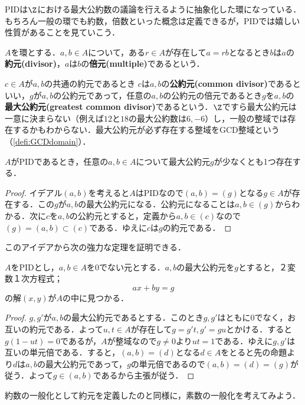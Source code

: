 PIDは$\Z$における最大公約数の議論を行えるように抽象化した環になっている．もちろん一般の環でも約数，倍数といった概念は定義できるが，PIDでは嬉しい性質があることを見ていこう．

\begin{defi}[約元，倍元]
	$A$を環とする．$a,b\in A$について，ある$r\in A$が存在して$a=rb$となるとき$b$は$a$の\textbf{約元(divisor)}，$a$は$b$の\textbf{倍元(multiple)}であるという．
\end{defi}

$c\in A$が$a,b$の共通の約元であるとき $c$は$a,b$の\textbf{公約元(common divisor)}であるといい，$g$が$a,b$の公約元であって，任意の$a,b$の公約元の倍元であるとき$g$を$a,b$の\textbf{最大公約元(greatest common divisor)}であるという．$\Z$ですら最大公約元は一意に決まらない（例えば$12$と$18$の最大公約数は$6,-6$）し，一般の整域では存在するかもわからない．最大公約元が必ず存在する整域をGCD整域という（\ref{defi:GCDdomain}）．

\begin{prop}\label{prop:PIDはGCD}
	$A$がPIDであるとき，任意の$a,b\in A$について最大公約元$g$が少なくとも1つ存在する．
\end{prop}

\begin{proof}
	イデアル$(a,b)$を考えると$A$はPIDなので$(a,b)=(g)$となる$g\in A$が存在する．この$g$が$a,b$の最大公約元になる．公約元になることは$a,b\in(g)$からわかる．次に$c$を$a,b$の公約元とすると，定義から$a,b\in (c)$なので$(g)=(a,b)\subset (c)$である．ゆえに$c$は$g$の約元である．
\end{proof}

このアイデアから次の強力な定理を証明できる．
\begin{thm}
	$A$をPIDとし，$a,b\in A$を0でない元とする．$a,b$の最大公約元を$g$とすると，２変数１次方程式；
	\[ax+by=g\]
	の解$(x,y)$が$A$の中に見つかる．
\end{thm}

\begin{proof}
	$g,g'$が$a,b$の最大公約元であるとする．このとき$g,g'$はともに0でなく，お互いの約元である．よって$u,t\in A$が存在して$g=g't,g'=gu$とかける．すると$g(1-ut)=0$であるが，$A$が整域なので$g\neq0$より$ut=1$である．ゆえに$g,g'$は互いの単元倍である．すると，$(a,b)=(d)$となる$d\in A$をとると先の命題より$d$は$a,b$の最大公約元であって，$g$の単元倍であるので$(a,b)=(d)=(g)$が従う．よって$g\in (a,b)$であるから主張が従う．
\end{proof}

約数の一般化として約元を定義したのと同様に，素数の一般化を考えてみよう．

